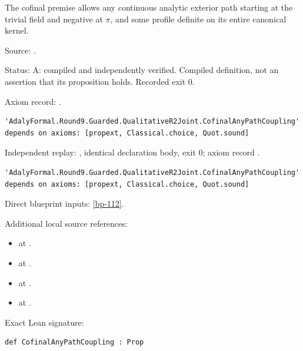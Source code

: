 \begin{definition}[bp-128]
\label{bp-128}
\leanok
The cofinal premise allows any continuous analytic exterior path starting at the trivial field and negative at \(\pi\), and some profile definite on its entire canonical kernel.

\par Source: \texttt{}.
\par Status: A: compiled and independently verified. Compiled definition, not an assertion that its proposition holds. Recorded exit 0.
\par Axiom record: \texttt{}.
\begin{verbatim}
'AdalyFormal.Round9.Guarded.QualitativeR2Joint.CofinalAnyPathCoupling' depends on axioms: [propext, Classical.choice, Quot.sound]
\end{verbatim}
\par Independent replay: \texttt{}, identical declaration body, exit 0; axiom record \texttt{}.
\begin{verbatim}
'AdalyFormal.Round9.Guarded.QualitativeR2Joint.CofinalAnyPathCoupling' depends on axioms: [propext, Classical.choice, Quot.sound]
\end{verbatim}
\par Direct blueprint inputs: \ref{bp-112}.
\par Additional local source references:
\begin{itemize}
\item \texttt{} at \texttt{}.
\item \texttt{} at \texttt{}.
\item \texttt{} at \texttt{}.
\item \texttt{} at \texttt{}.
\end{itemize}
\par Exact Lean signature:
\begin{verbatim}
def CofinalAnyPathCoupling : Prop
\end{verbatim}
\end{definition}

